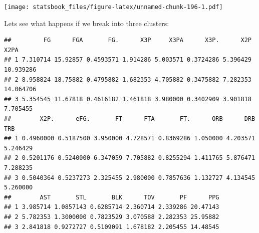\documentclass[
]{book}
\newenvironment{Shaded}{\begin{snugshade}}{\end{snugshade}}
\newcommand{\AttributeTok}[1]{\textcolor[rgb]{0.77,0.63,0.00}{#1}}
\newcommand{\DecValTok}[1]{\textcolor[rgb]{0.00,0.00,0.81}{#1}}
\newcommand{\FunctionTok}[1]{\textcolor[rgb]{0.00,0.00,0.00}{#1}}
\newcommand{\NormalTok}[1]{#1}
\newcommand{\OtherTok}[1]{\textcolor[rgb]{0.56,0.35,0.01}{#1}}
\newcommand{\SpecialCharTok}[1]{\textcolor[rgb]{0.00,0.00,0.00}{#1}}
\theoremstyle{definition}
\theoremstyle{definition}
\theoremstyle{definition}
\theoremstyle{definition}
\theoremstyle{remark}
\begin{document}
\begin{Shaded}
\end{Shaded}

\texttt{[image: statsbook\_files/figure-latex/unnamed-chunk-196-1.pdf]}

Lets see what happens if we break into three clusters:

\begin{Shaded}
\end{Shaded}

\begin{verbatim}
##         FG      FGA       FG.      X3P     X3PA      X3P.      X2P      X2PA
## 1 7.310714 15.92857 0.4593571 1.914286 5.003571 0.3724286 5.396429 10.939286
## 2 8.958824 18.75882 0.4795882 1.682353 4.705882 0.3475882 7.282353 14.064706
## 3 5.354545 11.67818 0.4616182 1.461818 3.980000 0.3402909 3.901818  7.705455
##        X2P.      eFG.       FT      FTA       FT.      ORB      DRB      TRB
## 1 0.4960000 0.5187500 3.950000 4.728571 0.8369286 1.050000 4.203571 5.246429
## 2 0.5201176 0.5240000 6.347059 7.705882 0.8255294 1.411765 5.876471 7.288235
## 3 0.5040364 0.5237273 2.325455 2.980000 0.7857636 1.132727 4.134545 5.260000
##        AST       STL       BLK      TOV       PF      PPG
## 1 3.985714 1.0857143 0.6285714 2.360714 2.339286 20.47143
## 2 5.782353 1.3000000 0.7823529 3.070588 2.282353 25.95882
## 3 2.841818 0.9272727 0.5109091 1.678182 2.205455 14.48545
\end{verbatim}

\begin{Shaded}
\end{Shaded}
\end{document}
